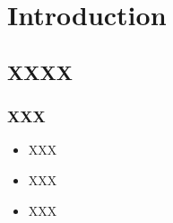 \documentclass{beamer}
\title{\talktitle}
\author{\Us}
\date{\today}
\begin{document}
\frame{\titlepage}

\section[Outline]{}
\frame{\tableofcontents}

\section{Introduction}
\subsection{XXXX}
\frame
{
  \frametitle{XXX}

  \begin{itemize}
  \item<1-> XXX
  \item<2-> XXX
  \item<3-> XXX      
  \end{itemize}
}

\frame
{
  \sudokuexampleone
}
\end{document}
